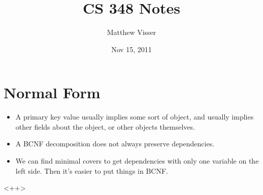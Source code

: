 \documentclass[12pt]{article}
\begin{document}
\title{CS 348 Notes}
\author{Matthew Visser}
\date{Nov 15, 2011}
\maketitle

\section{Normal Form}

\begin{itemize}
	\item A primary key value usually implies some sort of object, and usually
		implies other fields about the object, or other objects themselves.
	\item A BCNF decomposition does not always preserve dependencies.
	\item We can find minimal covers to get dependencies with only one variable
		on the left side. Then it's easier to put things in BCNF.
\end{itemize}<++>
\end{document}
